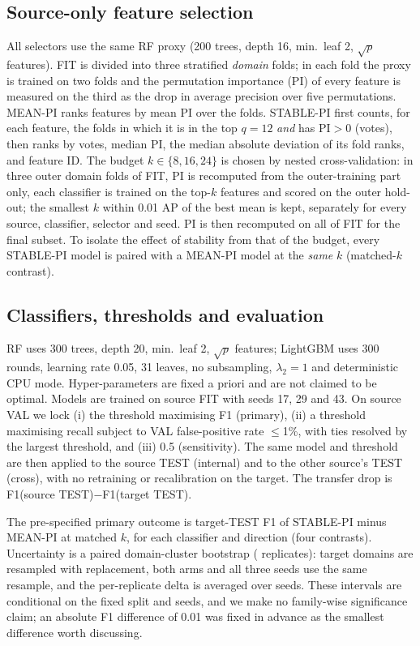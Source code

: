 \subsection{Source-only feature selection}
All selectors use the same RF proxy (200 trees, depth 16, min.\ leaf 2, $\sqrt{p}$ features). FIT is divided into three stratified \emph{domain} folds; in each fold the proxy is trained on two folds and the permutation importance (PI) of every feature is measured on the third as the drop in average precision over five permutations. MEAN-PI ranks features by mean PI over the folds. STABLE-PI first counts, for each feature, the folds in which it is in the top $q{=}12$ \emph{and} has PI${>}0$ (votes), then ranks by votes, median PI, the median absolute deviation of its fold ranks, and feature ID. The budget $k\in\{8,16,24\}$ is chosen by nested cross-validation: in three outer domain folds of FIT, PI is recomputed from the outer-training part only, each classifier is trained on the top-$k$ features and scored on the outer hold-out; the smallest $k$ within 0.01 AP of the best mean is kept, separately for every source, classifier, selector and seed. PI is then recomputed on all of FIT for the final subset. To isolate the effect of stability from that of the budget, every STABLE-PI model is paired with a MEAN-PI model at the \emph{same} $k$ (matched-$k$ contrast).

\subsection{Classifiers, thresholds and evaluation}
RF uses 300 trees, depth 20, min.\ leaf 2, $\sqrt{p}$ features; LightGBM uses 300 rounds, learning rate 0.05, 31 leaves, no subsampling, $\lambda_2{=}1$ and deterministic CPU mode. Hyper-parameters are fixed a priori and are not claimed to be optimal. Models are trained on source FIT with seeds 17, 29 and 43. On source VAL we lock (i) the threshold maximising F1 (primary), (ii) a threshold maximising recall subject to VAL false-positive rate $\le$1\%, with ties resolved by the largest threshold, and (iii) 0.5 (sensitivity). The same model and threshold are then applied to the source TEST (internal) and to the other source's TEST (cross), with no retraining or recalibration on the target. The transfer drop is F1(source TEST)$-$F1(target TEST).

The pre-specified primary outcome is target-TEST F1 of STABLE-PI minus MEAN-PI at matched $k$, for each classifier and direction (four contrasts). Uncertainty is a paired domain-cluster bootstrap ( replicates): target domains are resampled with replacement, both arms and all three seeds use the same resample, and the per-replicate delta is averaged over seeds. These intervals are conditional on the fixed split and seeds, and we make no family-wise significance claim; an absolute F1 difference of 0.01 was fixed in advance as the smallest difference worth discussing.

